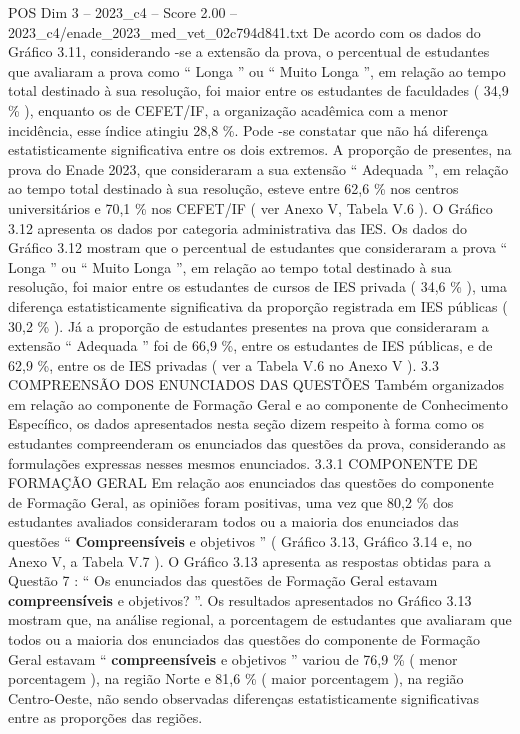 \begin{textsample}{POS Dim 3 – 2023\_c4 – Score 2.00 – 2023\_c4/enade\_2023\_med\_vet\_02c794d841.txt}
De acordo com os dados do Gráfico 3.11, considerando -se a extensão da prova, o percentual de estudantes que avaliaram a prova como “ Longa ” ou “ Muito Longa ”, em relação ao tempo total destinado à sua resolução, foi maior entre os estudantes de faculdades ( 34,9 \% ), enquanto os de CEFET/IF, a organização acadêmica com a menor incidência, esse índice atingiu 28,8 \%.
Pode -se constatar que não há diferença estatisticamente significativa entre os dois extremos.
A proporção de presentes, na prova do Enade 2023, que consideraram a sua extensão “ Adequada ”, em relação ao tempo total destinado à sua resolução, esteve entre 62,6 \% nos centros universitários e 70,1 \% nos CEFET/IF ( ver Anexo V, Tabela V.6 ).
O Gráfico 3.12 apresenta os dados por categoria administrativa das IES.
Os dados do Gráfico 3.12 mostram que o percentual de estudantes que consideraram a prova “ Longa ” ou “ Muito Longa ”, em relação ao tempo total destinado à sua resolução, foi maior entre os estudantes de cursos de IES privada ( 34,6 \% ), uma diferença estatisticamente significativa da proporção registrada em IES públicas ( 30,2 \% ).
Já a proporção de estudantes presentes na prova que consideraram a extensão “ Adequada ” foi de 66,9 \%, entre os estudantes de IES públicas, e de 62,9 \%, entre os de IES privadas ( ver a Tabela V.6 no Anexo V ). 3.3 COMPREENSÃO DOS ENUNCIADOS DAS QUESTÕES Também organizados em relação ao componente de Formação Geral e ao componente de Conhecimento Específico, os dados apresentados nesta seção dizem respeito à forma como os estudantes compreenderam os enunciados das questões da prova, considerando as formulações expressas nesses mesmos enunciados. 3.3.1 COMPONENTE DE FORMAÇÃO GERAL Em relação aos enunciados das questões do componente de Formação Geral, as opiniões foram positivas, uma vez que 80,2 \% dos estudantes avaliados consideraram todos ou a maioria dos enunciados das questões “ \textbf{Compreensíveis} e objetivos ” ( Gráfico 3.13, Gráfico 3.14 e, no Anexo V, a Tabela V.7 ).
O Gráfico 3.13 apresenta as respostas obtidas para a Questão 7 : “ Os enunciados das questões de Formação Geral estavam \textbf{compreensíveis} e objetivos? ”.
Os resultados apresentados no Gráfico 3.13 mostram que, na análise regional, a porcentagem de estudantes que avaliaram que todos ou a maioria dos enunciados das questões do componente de Formação Geral estavam “ \textbf{compreensíveis} e objetivos ” variou de 76,9 \% ( menor porcentagem ), na região Norte e 81,6 \% ( maior porcentagem ), na região Centro-Oeste, não sendo observadas diferenças estatisticamente significativas entre as proporções das regiões.

\end{textsample}
